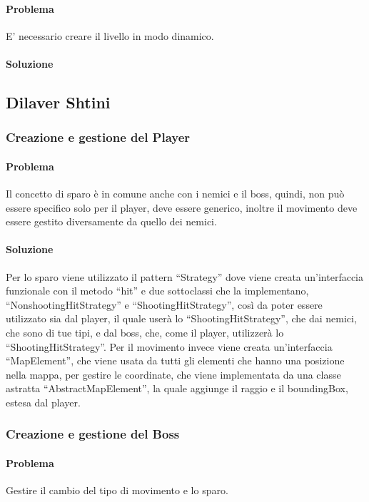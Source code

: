 \documentclass[a4paper,12pt]{report}
\begin{document}
\paragraph{Problema} E' necessario creare il livello in modo dinamico.

\paragraph{Soluzione}



\subsection*{Dilaver Shtini}
\subsubsection{Creazione e gestione del Player}
\paragraph{Problema}
Il concetto di sparo è in comune anche con i nemici e il boss, quindi, non può essere specifico solo per il player, deve essere generico, inoltre il movimento deve essere gestito diversamente da quello dei nemici.
\paragraph{Soluzione}
Per lo sparo viene utilizzato il pattern “Strategy” dove viene creata un’interfaccia funzionale con il metodo “hit” e due sottoclassi che la implementano, “NonshootingHitStrategy” e “ShootingHitStrategy”, così da poter essere utilizzato sia dal player, il quale userà lo “ShootingHitStrategy”, che dai nemici, che sono di tue tipi, e dal boss, che, come il player, utilizzerà lo “ShootingHitStrategy”.                          Per il movimento invece viene creata un’interfaccia “MapElement”, che viene usata da tutti gli elementi che hanno una posizione nella mappa, per gestire le coordinate, che viene implementata da una classe astratta “AbstractMapElement”, la quale aggiunge il raggio e il boundingBox, estesa dal player.

\subsubsection{Creazione e gestione del Boss}
\paragraph{Problema}
Gestire il cambio del tipo di movimento e lo sparo.
\end{document}
